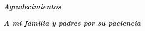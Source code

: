 \begin{flushright}

\vspace{80mm}

\textit{\textbf{Agradecimientos}}
\end{flushright}
\begin{flushright}
\textit{\textbf{A mi familia y padres por su paciencia}}
\end{flushright}